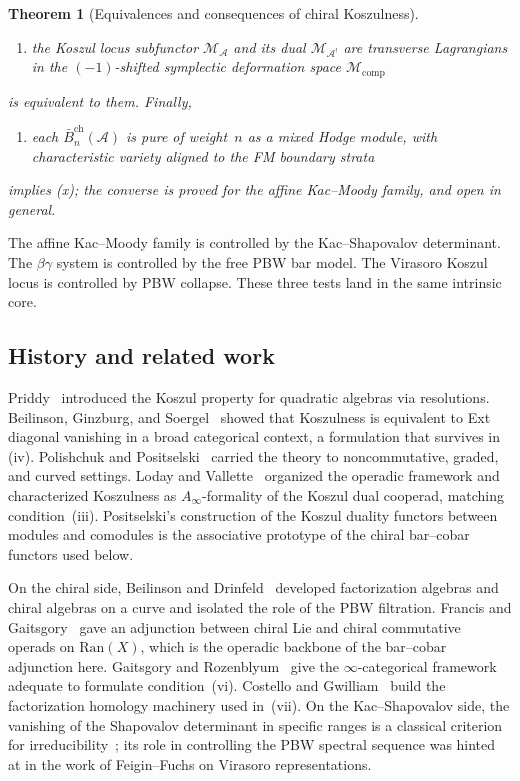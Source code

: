 \documentclass[11pt,reqno]{amsart}
\newtheorem{theorem}{Theorem}[section]
\theoremstyle{definition}
\theoremstyle{remark}
\newcommand{\cA}{\mathcal{A}}
\newcommand{\cM}{\mathcal{M}}
\newcommand{\barBgeom}{\bar{B}^{\mathrm{ch}}}
\newcommand{\Ran}{\mathrm{Ran}}
\numberwithin{equation}{section}
\begin{document}
\begin{theorem}[Equivalences and consequences of chiral Koszulness]
\begin{enumerate}[label=\textup{(\roman*)},leftmargin=2.4em,start=11]
\item the Koszul locus subfunctor $\cM_\cA$ and its dual
 $\cM_{\cA^!}$ are transverse Lagrangians in the $(-1)$-shifted
 symplectic deformation space $\cM_{\mathrm{comp}}$
\end{enumerate}
is equivalent to them. Finally,
\begin{enumerate}[label=\textup{(\roman*)},leftmargin=2.4em,start=12]
\item each $\barBgeom_n(\cA)$ is pure of weight~$n$ as a mixed
 Hodge module, with characteristic variety aligned to the FM
 boundary strata
\end{enumerate}
implies \textup{(x)}; the converse is proved for the affine
Kac--Moody family, and open in general.
\end{theorem}

The affine Kac--Moody family is controlled by the Kac--Shapovalov
determinant. The $\beta\gamma$ system is controlled by the free
PBW bar model. The Virasoro Koszul locus is controlled by PBW
collapse. These three tests land in the same intrinsic core.

\subsection{History and related work}

Priddy~\cite{Priddy} introduced the Koszul property for quadratic
algebras via resolutions. Beilinson, Ginzburg, and
Soergel~\cite{BGS} showed that Koszulness is equivalent to Ext
diagonal vanishing in a broad categorical context, a formulation
that survives in (iv). Polishchuk and Positselski~\cite{PP}
carried the theory to noncommutative, graded, and curved settings.
Loday and Vallette~\cite{LV12} organized the operadic framework
and characterized Koszulness as $A_\infty$-formality of the Koszul
dual cooperad, matching condition~\textup{(iii)}. Positselski's construction
of the Koszul duality functors between modules and comodules is
the associative prototype of the chiral bar--cobar functors used
below.

On the chiral side, Beilinson and Drinfeld~\cite{BD04} developed
factorization algebras and chiral algebras on a curve and isolated
the role of the PBW filtration. Francis and
Gaitsgory~\cite{FG12} gave an adjunction between chiral Lie and
chiral commutative operads on $\Ran(X)$, which is the operadic
backbone of the bar--cobar adjunction here. Gaitsgory and
Rozenblyum~\cite{GR17} give the $\infty$-categorical framework
adequate to formulate condition~(vi). Costello and
Gwilliam~\cite{CG} build the factorization homology machinery
used in~(vii). On the Kac--Shapovalov side, the vanishing of the
Shapovalov determinant in specific ranges is a classical criterion
for irreducibility~\cite{KacBook}; its role in controlling the
PBW spectral sequence was hinted at in the work of
Feigin--Fuchs on Virasoro representations.
\end{document}
